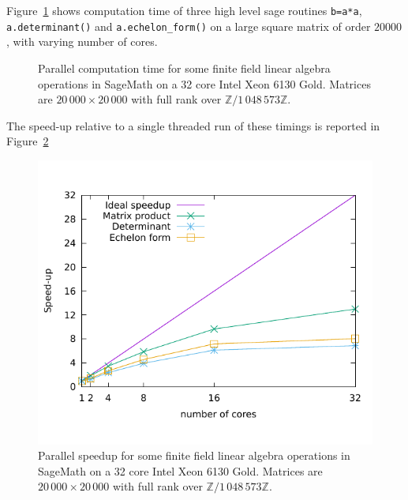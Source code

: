\documentclass{deliverablereport}
\begin{document}
Figure~\ref{fig:histo_sage} shows computation time of three high level sage routines
  \texttt{b=a*a},  \texttt{a.determinant()} and \texttt{a.echelon\_form()} on a large square matrix of
order $20000$, with varying number of cores.
\begin{figure}[htb]
  \begin{center}
    \caption{Parallel computation time for some finite field linear algebra operations in SageMath on a 32 core Intel
      Xeon 6130 Gold. Matrices are $20\,000\times 20\,000$ with full rank over $\mathbb{Z}/1\,048\,573\mathbb{Z}$. }
    \label{fig:histo_sage}
  \end{center}
\end{figure}
The speed-up relative to a single threaded run of these timings is reported in Figure~\ref{fig:speedup_sage}
\begin{figure}[htb]
  \begin{center}
    \includegraphics[width=.7\textwidth]{Pictures/speedup_bigfoot3}
    \caption{Parallel speedup for some finite field linear algebra operations in SageMath on a 32 core Intel
      Xeon 6130 Gold. Matrices are $20\,000\times 20\,000$ with full rank over $\mathbb{Z}/1\,048\,573\mathbb{Z}$.}
    \label{fig:speedup_sage}
  \end{center}
\end{figure}
\end{document}
